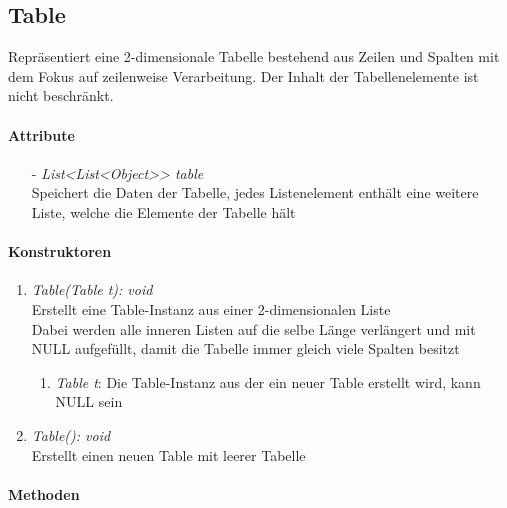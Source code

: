 \subsection{Table}
Repräsentiert eine 2-dimensionale Tabelle bestehend aus Zeilen und Spalten mit dem Fokus auf zeilenweise Verarbeitung. Der Inhalt der Tabellenelemente ist nicht beschränkt.


\paragraph{Attribute}

\begin{itemize}
	\item[-] \textit{List{<List<Object>}> table} \\
	Speichert die Daten der Tabelle, jedes Listenelement enthält eine weitere Liste, welche die Elemente der Tabelle hält
\end{itemize}

\paragraph{Konstruktoren}

\begin{enumerate}[+]
	\item \textit{Table(Table t): void} \\
	Erstellt eine Table-Instanz aus einer 2-dimensionalen Liste \\
	Dabei werden alle inneren Listen auf die selbe Länge verlängert und mit NULL aufgefüllt, damit die Tabelle immer gleich viele Spalten besitzt	
	\begin{enumerate}[$\bullet$]
		\item \textit{Table t}: Die Table-Instanz aus der ein neuer Table erstellt wird, kann NULL sein
	\end{enumerate}
	\vspace{-0.2cm}
	\item \textit{Table(): void} \\
	Erstellt einen neuen Table mit leerer Tabelle
\end{enumerate}
			
\paragraph{Methoden}

